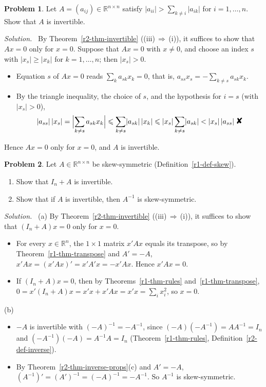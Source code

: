 \documentclass[12pt]{article}
\newcommand{\R}{\mathbb R}
\newcommand{\contradiction}{\mathord{\text{\large\ding{56}}}}
\theoremstyle{definition}
\newtheorem{problem}{Problem}
\newenvironment{solution}{\par\noindent\textit{Solution.}\ }{\par\smallskip}
\begin{document}
\begin{problem}\label{r2-ex-pr-diag-dominant}
Let \(A=(a_{ij})\in\R^{n\times n}\) satisfy \(\lvert a_{ii}\rvert>\sum_{k\ne i}\lvert a_{ik}\rvert\) for
\(i=1,\dots,n\). Show that \(A\) is invertible.
\end{problem}
\begin{solution}
By Theorem~\ref{r2-thm-invertible} ((iii)\,\(\Rightarrow\)\,(i)), it suffices to show that \(Ax=0\) only for \(x=0\).
Suppose that \(Ax=0\) with \(x\ne0\), and choose an index \(s\) with \(\lvert x_s\rvert\geqslant\lvert x_k\rvert\) for
\(k=1,\dots,n\); then \(\lvert x_s\rvert>0\).
\begin{itemize}
\item Equation \(s\) of \(Ax=0\) reads \(\sum_ka_{sk}x_k=0\), that is, \(a_{ss}x_s=-\sum_{k\ne s}a_{sk}x_k\).
\item By the triangle inequality, the choice of \(s\), and the hypothesis for \(i=s\) (with \(\lvert x_s\rvert>0\)),
\[
\lvert a_{ss}\rvert\,\lvert x_s\rvert=\Bigl\lvert\sum_{k\ne s}a_{sk}x_k\Bigr\rvert
\leqslant\sum_{k\ne s}\lvert a_{sk}\rvert\,\lvert x_k\rvert\leqslant\lvert x_s\rvert\sum_{k\ne s}\lvert a_{sk}\rvert
<\lvert x_s\rvert\,\lvert a_{ss}\rvert\ \contradiction
\]
\end{itemize}
Hence \(Ax=0\) only for \(x=0\), and \(A\) is invertible.
\end{solution}

\begin{problem}\label{r2-ex-pr-skew-inverse}
Let \(A\in\R^{n\times n}\) be skew-symmetric (Definition~\ref{r1-def-skew}).
\begin{enumerate}
\item Show that \(I_n+A\) is invertible.
\item Show that if \(A\) is invertible, then \(A^{-1}\) is skew-symmetric.
\end{enumerate}
\end{problem}
\begin{solution}
(a) By Theorem~\ref{r2-thm-invertible} ((iii)\,\(\Rightarrow\)\,(i)), it suffices to show that \((I_n+A)x=0\) only for
\(x=0\).
\begin{itemize}
\item For every \(x\in\R^n\), the \(1\times1\) matrix \(x'Ax\) equals its transpose, so by
Theorem~\ref{r1-thm-transpose} and \(A'=-A\), \(x'Ax=(x'Ax)'=x'A'x=-x'Ax\). Hence \(x'Ax=0\).
\item If \((I_n+A)x=0\), then by Theorems~\ref{r1-thm-rules} and~\ref{r1-thm-transpose},
\(0=x'(I_n+A)x=x'x+x'Ax=x'x=\sum_ix_i^2\), so \(x=0\).
\end{itemize}
(b)
\begin{itemize}
\item \(-A\) is invertible with \((-A)^{-1}=-A^{-1}\), since \((-A)(-A^{-1})=AA^{-1}=I_n\) and
\((-A^{-1})(-A)=A^{-1}A=I_n\) (Theorem~\ref{r1-thm-rules}, Definition~\ref{r2-def-inverse}).
\item By Theorem~\ref{r2-thm-inverse-props}(c) and \(A'=-A\), \((A^{-1})'=(A')^{-1}=(-A)^{-1}=-A^{-1}\). So \(A^{-1}\)
is skew-symmetric.
\end{itemize}
\end{solution}
\end{document}

